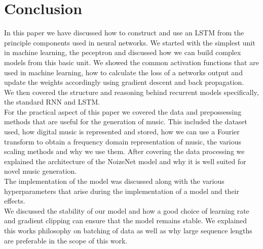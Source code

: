 \documentclass{article}
\begin{document}
\section{Conclusion}
\label{sec:conclusion}
In this paper we have discussed how to construct and use an LSTM from the principle components used in neural networks. We started with the simplest unit in machine learning, the peceptron and discussed how we can build complex models from this basic unit. We showed the common activation functions that are used in machine learning, how to calculate the loss of a networks output and update the weights accordingly using gradient descent and back propagation. 
\\
We then covered the structure and reasoning behind recurrent models specifically, the standard RNN and LSTM. 
\\
For the practical aspect of this paper we covered the data and prepossessing methods that are useful for the generation of music. This included the dataset used, how digital music is represented and stored, how we can use a Fourier transform to obtain a frequency domain representation of music, the various scaling methods and why we use them. After covering the data  processing we explained the architecture of the NoizeNet model and why it is well suited for novel music generation. \\
The implementation of the model was discussed along with the various hyperparameters that arise during the implementation of a model and their effects. \\
We discussed the stability of our model and how a good choice of learning rate and gradient clipping can ensure that the model remains stable. We explained this works philosophy on batching of data as well as why large sequence lengths are preferable in the scope of this work. \\
\end{document}
